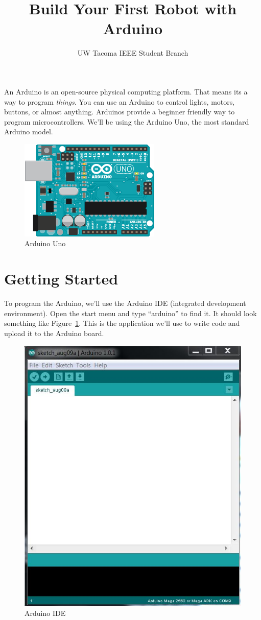 \documentclass[letterpaper]{article}
\title{Build Your First Robot with Arduino}
\author{UW Tacoma IEEE Student Branch}
\begin{document}
\maketitle

An Arduino is an open-source physical computing platform.
That means its a way to program \emph{things}.
You can use an Arduino to control lights, motors, buttons, or almost anything.
Arduinos provide a beginner friendly way to program microcontrollers.
We'll be using the Arduino Uno,
the most standard Arduino model.

\begin{figure}[h!]
    \centering
    \includegraphics[width=.5\textwidth]{uno.png}
    \caption{Arduino Uno}
\end{figure}

\section{Getting Started}
\label{sec:getting_started}

To program the Arduino,
we'll use the Arduino IDE (integrated development environment).
Open the start menu and type ``arduino'' to find it.
It should look something like Figure~\ref{fig:ide}.
This is the application we'll use to write code
and upload it to the Arduino board.

\begin{figure}[h!]
    \centering
    \includegraphics[width=.5\textwidth]{ide.jpg}
    \caption{Arduino IDE}
    \label{fig:ide}
\end{figure}
\end{document}
